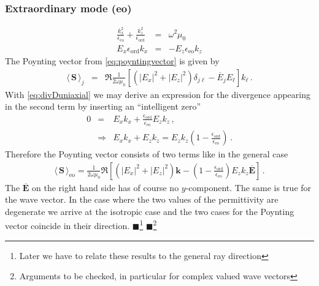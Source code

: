 \documentclass[12pt,a4paper,twoside,openright,BCOR10mm,headsepline,titlepage,abstracton,chapterprefix,final]{scrreprt}
\newcommand\Vector[1]{{\mathbf{#1}}}
\newcommand\vacuum{0}
\newcommand\wavenumber{k}
\newcommand\Wavevector{\Vector{\wavenumber}}
\newcommand\scalarEfield{E}
\newcommand\Efield{\Vector{\scalarEfield}}
\newcommand\vacuumpermeability{\mu_{\vacuum}}
\newcommand\scalarpermittivity{\epsilon}
\newcommand\ordi{\text{ord}}
\newcommand\eo{\text{eo}}
\newcommand{\timeavg}[1]{{\langle\,#1\,\rangle}}
\newcommand{\remark}[1]{{\color{red}$\blacksquare$}\footnote{{\color{red}#1}}}
\begin{document}
\subsubsection{Extraordinary mode (eo)}
\begin{eqnarray}
  \frac{\wavenumber_{x}^2 }{\scalarpermittivity_{\eo} } + \frac{\wavenumber_{z}^2 }{\scalarpermittivity_{\ordi} } &=& \omega^2 \vacuumpermeability 
  \label{eq:uniaxialAnisotropicDispersion}
  \\
  \scalarEfield_x \scalarpermittivity_{\ordi} \wavenumber_x &=& -  \scalarEfield_z \scalarpermittivity_{\eo} \wavenumber_z \label{eq:divDuniaxial}
\end{eqnarray}
The Poynting vector from \eqref{eq:poyntingvector} is given by
\begin{eqnarray}
 \timeavg{\Vector{S}}_j &=&  \Re\frac{1}{2 \omega \vacuumpermeability}\left[ (|\scalarEfield_x|^2 + |\scalarEfield_z|^2) \delta_{j\ell}  - \overline{\scalarEfield}_j \scalarEfield_\ell \right] k_\ell\,.
\end{eqnarray}
With \eqref{eq:divDuniaxial} we may derive an expression for the divergence appearing in the second term by inserting an ``intelligent zero''
\begin{eqnarray}
 0 &=& \scalarEfield_x \wavenumber_x + \frac{\scalarpermittivity_{\ordi}}{\scalarpermittivity_\eo} \scalarEfield_z \wavenumber_z\,,\nonumber\\
&\Rightarrow& \scalarEfield_x \wavenumber_x + \scalarEfield_z \wavenumber_z = \scalarEfield_z \wavenumber_z \left(1 - \frac{\scalarpermittivity_{\ordi}}{\scalarpermittivity_\eo}\right)\,. \label{eq:divEviolation}
\end{eqnarray}
Therefore the Poynting vector consists of two terms like in the general case
\begin{eqnarray}
  \timeavg{\Vector{S}}_\eo = \frac{ 1 }{ 2\omega\vacuumpermeability } \Re 
  \left[
      (|\scalarEfield_x|^2 + |\scalarEfield_z|^2)\Wavevector
      - \left(1 - \frac{\scalarpermittivity_{\ordi}}{\scalarpermittivity_\eo}\right)\scalarEfield_z \wavenumber_z \overline{\Efield}
  \right]\,.\label{eq:Suniaxialeo}
\end{eqnarray}
The $\overline{\Efield}$ on the right hand side has of course no $y$-component. The same is true for the wave vector.
In the case where the two values of the permittivity are degenerate we arrive at the isotropic case and the two cases for the
Poynting vector coincide in their direction.
\remark{Later we have to relate these results to the general ray direction}
\remark{Arguments to be checked, in particular for complex valued wave vectors}
\end{document}
